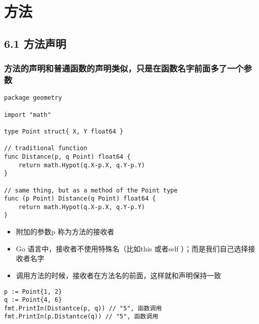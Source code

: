 \hypertarget{ux65b9ux6cd5}{%
\section{方法}\label{ux65b9ux6cd5}}

\hypertarget{ux65b9ux6cd5ux58f0ux660e}{%
\subsection{6.1 方法声明}\label{ux65b9ux6cd5ux58f0ux660e}}

\hypertarget{ux65b9ux6cd5ux7684ux58f0ux660eux548cux666eux901aux51fdux6570ux7684ux58f0ux660eux7c7bux4f3cux53eaux662fux5728ux51fdux6570ux540dux5b57ux524dux9762ux591aux4e86ux4e00ux4e2aux53c2ux6570}{%
\subsubsection{方法的声明和普通函数的声明类似，只是在函数名字前面多了一个参数}\label{ux65b9ux6cd5ux7684ux58f0ux660eux548cux666eux901aux51fdux6570ux7684ux58f0ux660eux7c7bux4f3cux53eaux662fux5728ux51fdux6570ux540dux5b57ux524dux9762ux591aux4e86ux4e00ux4e2aux53c2ux6570}}

\begin{verbatim}
package geometry

import "math"

type Point struct{ X, Y float64 }

// traditional function
func Distance(p, q Point) float64 {
    return math.Hypot(q.X-p.X, q.Y-p.Y)
}

// same thing, but as a method of the Point type
func (p Point) Distance(q Point) float64 {
    return math.Hypot(q.X-p.X, q.Y-p.Y)
}
\end{verbatim}

\begin{itemize}
\tightlist
\item
  附加的参数p 称为方法的接收者
\item
  Go 语言中，接收者不使用特殊名（比如this 或者self
  ）；而是我们自己选择接收者名字
\item
  调用方法的时候，接收者在方法名的前面，这样就和声明保持一致
\end{itemize}

\begin{verbatim}
p := Point{1, 2}
q := Point{4, 6}
fmt.PrintIn(Distantce(p, q)) // "5", 函数调用
fmt.PrintIn(p.Distantce(q)) // "5", 函数调用
\end{verbatim}

